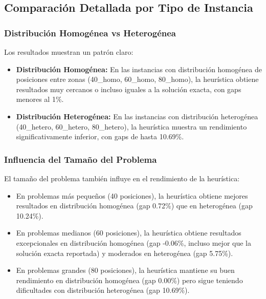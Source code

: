 \documentclass{hw-template}
\begin{document}
\subsection{Comparación Detallada por Tipo de Instancia}

\subsubsection{Distribución Homogénea vs Heterogénea}

Los resultados muestran un patrón claro:

\begin{itemize}
    \item \textbf{Distribución Homogénea:} En las instancias con distribución homogénea de posiciones entre zonas (40\_homo, 60\_homo, 80\_homo), la heurística obtiene resultados muy cercanos o incluso iguales a la solución exacta, con gaps menores al 1\%.
    
    \item \textbf{Distribución Heterogénea:} En las instancias con distribución heterogénea (40\_hetero, 60\_hetero, 80\_hetero), la heurística muestra un rendimiento significativamente inferior, con gaps de hasta 10.69\%.
\end{itemize}

\subsubsection{Influencia del Tamaño del Problema}

El tamaño del problema también influye en el rendimiento de la heurística:

\begin{itemize}
    \item En problemas más pequeños (40 posiciones), la heurística obtiene mejores resultados en distribución homogénea (gap 0.72\%) que en heterogénea (gap 10.24\%).
    
    \item En problemas medianos (60 posiciones), la heurística obtiene resultados excepcionales en distribución homogénea (gap -0.06\%, incluso mejor que la solución exacta reportada) y moderados en heterogénea (gap 5.75\%).
    
    \item En problemas grandes (80 posiciones), la heurística mantiene su buen rendimiento en distribución homogénea (gap 0.00\%) pero sigue teniendo dificultades con distribución heterogénea (gap 10.69\%).
\end{itemize}
\end{document}
